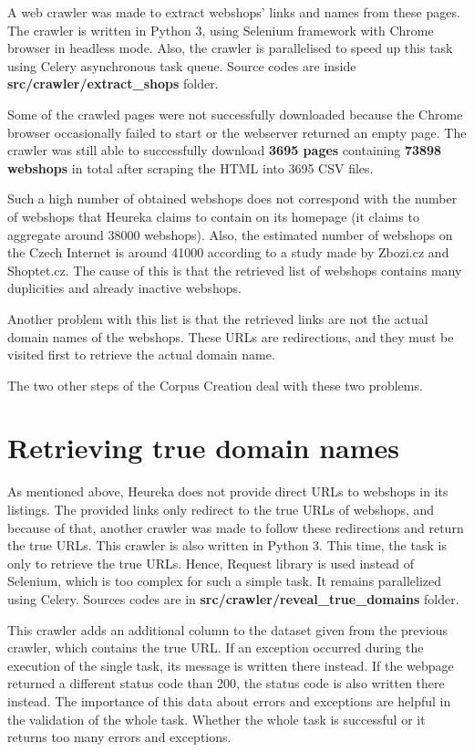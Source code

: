A web crawler was made to extract webshops' links and names from these pages. The crawler is written in Python 3, using Selenium framework with Chrome browser in headless mode. Also, the crawler is parallelised to speed up this task using Celery asynchronous task queue. Source codes are inside \textbf{src\string/crawler\string/extract\_shops} folder. 

Some of the crawled pages were not successfully downloaded because the Chrome browser occasionally failed to start or the webserver returned an empty page. The crawler was still able to successfully download \textbf{3695 pages} containing \textbf{73898 webshops} in total after scraping the HTML into 3695 CSV files.

Such a high number of obtained webshops does not correspond with the number of webshops that Heureka claims to contain on its homepage (it claims to aggregate around 38000 webshops). Also, the estimated number of webshops on the Czech Internet is around 41000 according to a study made by Zbozi.cz and Shoptet.cz\cite{srovnavace-shoptet}. The cause of this is that the retrieved list of webshops contains many duplicities and already inactive webshops.

Another problem with this list is that the retrieved links are not the actual domain names of the webshops. These URLs are redirections, and they must be visited first to retrieve the actual domain name.

The two other steps of the Corpus Creation deal with these two problems.

\section{Retrieving true domain names}

As mentioned above, Heureka does not provide direct URLs to webshops in its listings. The provided links only redirect to the true URLs of webshops, and because of that, another crawler was made to follow these redirections and return the true URLs. This crawler is also written in Python 3. This time, the task is only to retrieve the true URLs. Hence, Request library is used instead of Selenium, which is too complex for such a simple task. It remains parallelized using Celery. Sources codes are in \textbf{src\string/crawler\string/reveal\_true\_domains} folder.

This crawler adds an additional column to the dataset given from the previous crawler, which contains the true URL. If an exception occurred during the execution of the single task, its message is written there instead. If the webpage returned a different status code than 200, the status code is also written there instead. The importance of this data about errors and exceptions are helpful in the validation of the whole task. Whether the whole task is successful or it returns too many errors and exceptions.

